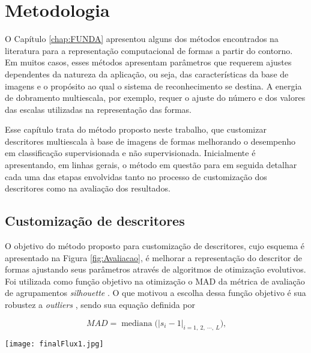 \chapter{Metodologia}
\label{chap:MatMet}

O Capítulo \ref{chap:FUNDA} apresentou alguns dos métodos encontrados na literatura para a representação computacional de formas a partir do contorno.  Em muitos casos, esses métodos apresentam parâmetros que requerem ajustes dependentes da natureza da aplicação, ou seja,  das características da base de imagens e o propósito ao qual o sistema de reconhecimento se destina. A energia de dobramento multiescala, por exemplo, requer o ajuste do número e dos valores das escalas utilizadas na representação das formas. 

Esse capítulo trata do método proposto neste trabalho, que customizar descritores multiescala à base de imagens de formas melhorando o desempenho em classificação supervisionada e não supervisionada. Inicialmente é apresentando, em linhas gerais, o método em questão para em seguida detalhar cada uma das etapas envolvidas tanto no processo de customização dos descritores como na avaliação dos resultados. 

\section{Customização de descritores\label{sec:met}}
O objetivo do método proposto para customização de descritores, cujo esquema é apresentado na Figura \ref{fig:Avaliacao}, é melhorar a representação do descritor de formas ajustando seus parâmetros através de algoritmos de otimização evolutivos. Foi utilizada como função objetivo na otimização o \ac{MAD} da métrica de avaliação de agrupamentos \textit{silhouette} \cite{Rousseeuw:1987}. O que motivou a escolha dessa função objetivo é sua robustez a \textit{outliers} \cite{Rousseeuw:1987:2}, sendo sua equação definida por

\begin{equation}
\label{eq:mad}
MAD = \operatorname{mediana}\big(|s_i - 1|_{i =1,\:2,\:\cdots,\:L}\big)\text{,}
\end{equation}

\begin{figure*}[ht]
\caption{\label{fig:Avaliacao}
 Proposta de uma metodologia para otimização evolucionária de um descritor multiescala de forma.} 
\centering
\texttt{[image: finalFlux1.jpg]}
\end{figure*}

